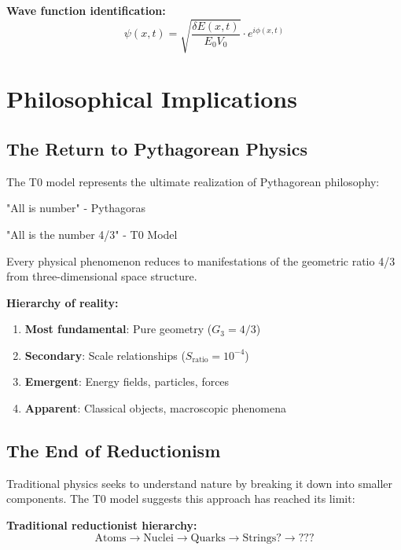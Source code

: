 \documentclass[12pt,a4paper]{report}
\begin{document}
\textbf{Wave function identification:}
\begin{equation}
	\psi(x,t) = \sqrt{\frac{\delta E(x,t)}{E_0 V_0}} \cdot e^{i\phi(x,t)}
\end{equation}

\section{Philosophical Implications}
\label{sec:philosophical_implications}

\subsection{The Return to Pythagorean Physics}
\label{subsec:pythagorean_physics}

The T0 model represents the ultimate realization of Pythagorean philosophy:

\begin{tcolorbox}[colback=blue!5!white,colframe=blue!75!black,title=Pythagorean Insight Realized]
	"All is number" - Pythagoras
	
	"All is the number 4/3" - T0 Model
	
	Every physical phenomenon reduces to manifestations of the geometric ratio 4/3 from three-dimensional space structure.
\end{tcolorbox}

\textbf{Hierarchy of reality:}
\begin{enumerate}
	\item \textbf{Most fundamental}: Pure geometry ($G_3 = 4/3$)
	\item \textbf{Secondary}: Scale relationships ($S_{\text{ratio}} = 10^{-4}$)
	\item \textbf{Emergent}: Energy fields, particles, forces
	\item \textbf{Apparent}: Classical objects, macroscopic phenomena
\end{enumerate}

\subsection{The End of Reductionism}
\label{subsec:end_reductionism}

Traditional physics seeks to understand nature by breaking it down into smaller components. The T0 model suggests this approach has reached its limit:

\textbf{Traditional reductionist hierarchy:}
\begin{equation}
	\text{Atoms} \rightarrow \text{Nuclei} \rightarrow \text{Quarks} \rightarrow \text{Strings?} \rightarrow \text{???}
\end{equation}
\end{document}
